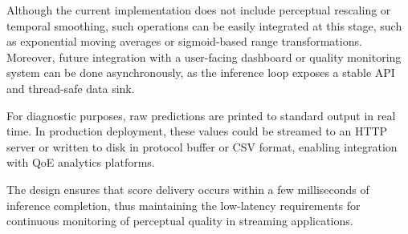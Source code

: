 Although the current implementation does not include perceptual rescaling or temporal smoothing, such operations can be easily integrated at this stage, such as exponential 
moving averages or sigmoid-based range transformations. Moreover, future integration with a user-facing dashboard or quality monitoring system can be done asynchronously, 
as the inference loop exposes a stable API and thread-safe data sink.

For diagnostic purposes, raw predictions are printed to standard output in real time. In production deployment, these values could be streamed to an HTTP server or written to disk in protocol buffer or CSV format, enabling integration with QoE analytics platforms.

The design ensures that score delivery occurs within a few milliseconds of inference completion, thus maintaining the low-latency requirements for continuous monitoring of perceptual quality in streaming applications.

